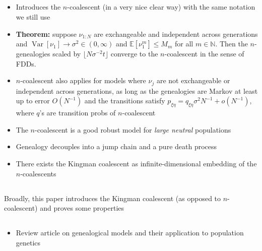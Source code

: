 \documentclass{article}
\newcommand{\E}{\mathbb{E}}
\newcommand{\V}{\operatorname{Var}}
\begin{document}
\subsection*{\cite{kingman1982gene}}
\begin{itemize}
\item Introduces the $n$-coalescent (in a very nice clear way) with the same notation we still use
\item \textbf{Theorem:} suppose $\nu_{1:N}$ are exchangeable and independent across generations and $\V[\nu_1]\to\sigma^2 \in (0,\infty)$ and $\E[\nu_1^m] \leq M_m$ for all $m\in\mathbb{N}$. Then the $n$-genealogies scaled by $\lfloor N\sigma^{-2}t \rfloor$ converge to the $n$-coalescent in the sense of FDDs.
\item $n$-coalescent also applies for models where $\nu_j$ are not exchangeable or independent across generations, as long as the genealogies are Markov at least up to error $O(N^{-1})$ and the transitions satisfy $p_{\xi\eta} = q_{\xi\eta}\sigma^2 N^{-1} + o(N^{-1})$, where $q$'s are transition probs of $n$-coalescent
\item The $n$-coalescent is a good robust model for \emph{large neutral} populations
\item Genealogy decouples into a jump chain and a pure death process
\item There exists the Kingman coalescent as infinite-dimensional embedding of the $n$-coalescents
\end{itemize}


\subsection*{\cite{kingman1982coal}}
Broadly, this paper introduces the Kingman coalescent (as opposed to $n$-coalescent) and proves some properties


\subsection*{\cite{tavare1984}}
\begin{itemize}
\item Review article on genealogical models and their application to population genetics
\end{itemize}
\end{document}
